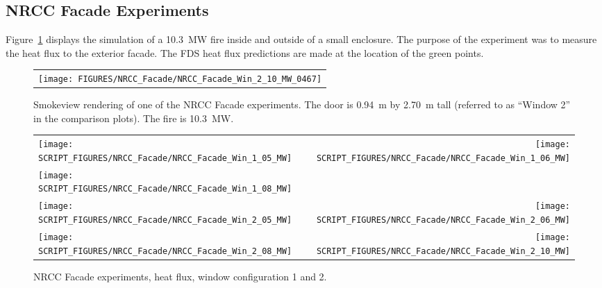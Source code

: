 \clearpage

\subsection{NRCC Facade Experiments}

Figure~\ref{NRCC_Facade_Image} displays the simulation of a 10.3~MW fire inside and outside of a small enclosure. The purpose of the experiment was to measure the heat flux to the exterior facade. The FDS heat flux predictions are made at the location of the green points.

\begin{figure}[h!]
\begin{center}
\begin{tabular}{c}
\texttt{[image: FIGURES/NRCC\_Facade/NRCC\_Facade\_Win\_2\_10\_MW\_0467]}
\end{tabular}
\end{center}
\caption[Smokeview rendering of NRCC Facade experiment]
{Smokeview rendering of one of the NRCC Facade experiments. The door is
0.94~m by 2.70~m tall (referred to as ``Window 2'' in the comparison plots). The
fire is 10.3~MW.}
\label{NRCC_Facade_Image}
\end{figure}

\newpage

\begin{figure}[p]
\begin{tabular*}{\textwidth}{l@{\extracolsep{\fill}}r}
\texttt{[image: SCRIPT\_FIGURES/NRCC\_Facade/NRCC\_Facade\_Win\_1\_05\_MW]} &
\texttt{[image: SCRIPT\_FIGURES/NRCC\_Facade/NRCC\_Facade\_Win\_1\_06\_MW]} \\
\texttt{[image: SCRIPT\_FIGURES/NRCC\_Facade/NRCC\_Facade\_Win\_1\_08\_MW]} &
  \\
\texttt{[image: SCRIPT\_FIGURES/NRCC\_Facade/NRCC\_Facade\_Win\_2\_05\_MW]} &
\texttt{[image: SCRIPT\_FIGURES/NRCC\_Facade/NRCC\_Facade\_Win\_2\_06\_MW]} \\
\texttt{[image: SCRIPT\_FIGURES/NRCC\_Facade/NRCC\_Facade\_Win\_2\_08\_MW]} &
\texttt{[image: SCRIPT\_FIGURES/NRCC\_Facade/NRCC\_Facade\_Win\_2\_10\_MW]}
\end{tabular*}
\caption[NRCC Facade experiments, heat flux, window configuration 1 and 2]{NRCC Facade experiments, heat flux, window configuration 1 and 2.}
\label{NRCC_Facade_1}
\end{figure}

